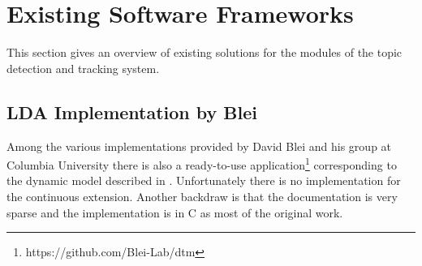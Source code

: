 \section{Existing Software Frameworks}\label{sec:software}

This section gives an overview of existing solutions for the modules of the topic detection and tracking system.

\subsection{LDA Implementation by Blei}

Among the various implementations provided by David Blei and his group at Columbia University there is also a ready-to-use application\footnote{https://github.com/Blei-Lab/dtm} corresponding to the dynamic model described in \cite{Blei:2006:DTM:1143844.1143859}. Unfortunately there is no implementation for the continuous extension. Another backdraw is that the documentation is very sparse and the implementation is in C as most of the original work.
